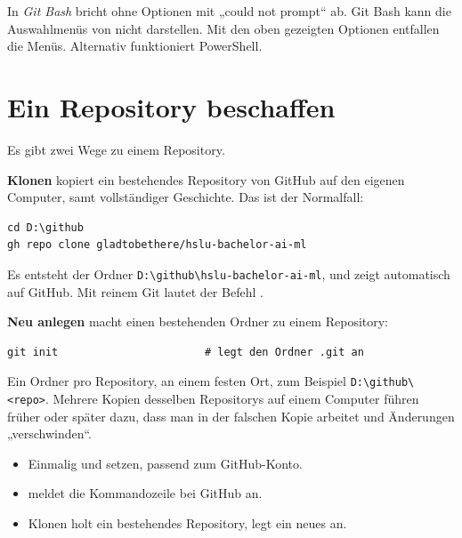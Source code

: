 \begin{fehler}
In \emph{Git Bash} bricht  ohne Optionen mit „could not prompt“ ab.
Git Bash kann die Auswahlmenüs von  nicht darstellen. Mit den oben gezeigten
Optionen entfallen die Menüs. Alternativ funktioniert PowerShell.
\end{fehler}

\section{Ein Repository beschaffen}

Es gibt zwei Wege zu einem Repository.

\textbf{Klonen} kopiert ein bestehendes Repository von GitHub auf den eigenen Computer,
samt vollständiger Geschichte. Das ist der Normalfall:

\begin{lstlisting}[style=befehle]
cd D:\github
gh repo clone gladtobethere/hslu-bachelor-ai-ml
\end{lstlisting}

Es entsteht der Ordner \texttt{D:\textbackslash{}github\textbackslash{}hslu-bachelor-ai-ml}, und  zeigt
automatisch auf GitHub. Mit reinem Git lautet der Befehl .

\textbf{Neu anlegen} macht einen bestehenden Ordner zu einem Repository:

\begin{lstlisting}[style=befehle]
git init                       # legt den Ordner .git an
\end{lstlisting}

\begin{erfahrung}
Ein Ordner pro Repository, an einem festen Ort, zum Beispiel \texttt{D:\textbackslash{}github\textbackslash{}<repo>}.
Mehrere Kopien desselben Repositorys auf einem Computer führen früher oder später dazu,
dass man in der falschen Kopie arbeitet und Änderungen „verschwinden“.
\end{erfahrung}

\begin{zusammenfassung}
\begin{itemize}[nosep]
  \item Einmalig  und  setzen, passend zum GitHub-Konto.
  \item {} meldet die Kommandozeile bei GitHub an.
  \item Klonen holt ein bestehendes Repository,  legt ein neues an.
\end{itemize}
\end{zusammenfassung}

